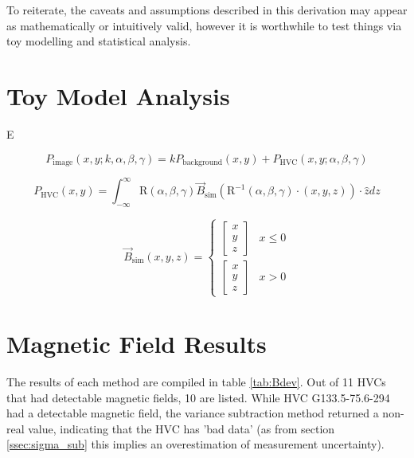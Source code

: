 To reiterate, the caveats and assumptions described in this derivation may appear as mathematically or intuitively valid, however it is worthwhile to test things via toy modelling and statistical analysis.


\section{Toy Model Analysis}
\label{sec:toy_models}

E

\begin{equation}
    P_{\mathrm{image}} (x,y;k,\alpha,\beta,\gamma) = k P_{\mathrm{background}}(x,y) + P_{\mathrm{HVC}} (x,y;\alpha,\beta,\gamma)
    \label{eq:image_toy}
\end{equation}

\begin{equation}
    P_{\mathrm{HVC}} (x,y) = \int_{-\infty}^{\infty}{\mathrm{R}(\alpha,\beta,\gamma)\vec{B}_{\mathrm{sim}}(\mathrm{R}^{-1}(\alpha,\beta,\gamma)\cdot(x,y,z)) \cdot \hat{z}dz}
    \label{eq:toy_vec}
\end{equation}

\begin{equation}
    \vec{B}_{\mathrm{sim}}(x,y,z) =
    \begin{cases}
        \begin{bmatrix} x \\ y \\ z \end{bmatrix} & x\leq 0 \\
        \begin{bmatrix} x \\ y \\ z \end{bmatrix} & x > 0
    \end{cases}
    \label{eq:toy_mag}
\end{equation}

\section{Magnetic Field Results}
\label{sec:results}

The results of each method are compiled in table \ref{tab:Bdev}. Out of 11 HVCs that had detectable magnetic fields, 10 are listed. While HVC G133.5-75.6-294 had a detectable magnetic field, the variance subtraction method returned a non-real value, indicating that the HVC has 'bad data' (as from section \ref{ssec:sigma_sub} this implies an overestimation of measurement uncertainty).



